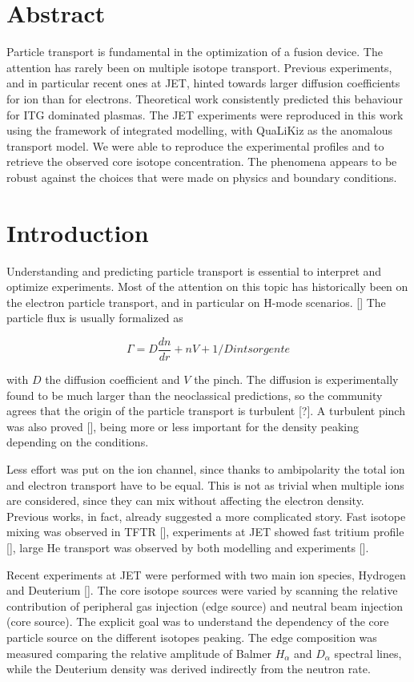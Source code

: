 \documentclass[a4paper,10pt]{iopart}
\begin{document}
\section{Abstract}
Particle transport is fundamental in the optimization of a fusion device. The attention has rarely been on multiple isotope transport. Previous experiments, and in particular recent ones at JET, hinted towards larger diffusion coefficients for ion than for electrons. Theoretical work consistently predicted this behaviour for ITG dominated plasmas. The JET experiments were reproduced in this work using the framework of integrated modelling, with QuaLiKiz as the anomalous transport model. We were able to reproduce the experimental profiles and to retrieve the observed core isotope concentration. The phenomena appears to be robust against the choices that were made on physics and boundary conditions.


\section{Introduction}

Understanding and predicting particle transport is essential to interpret and optimize experiments. Most of the attention on this topic has historically been on the electron particle transport, and in particular on H-mode scenarios. [] The particle flux is usually formalized as 

$$ \Gamma = D \frac{dn}{dr} + nV + 1/D int sorgente $$

with $ D $ the diffusion coefficient and $ V $ the pinch. The diffusion is experimentally found to be much larger than the neoclassical predictions, so the community agrees that the origin of the particle transport is turbulent [?]. A turbulent pinch was also proved [], being more or less important for the density peaking depending on the conditions.

Less effort was put on the ion channel, since thanks to ambipolarity the total ion and electron transport have to be equal. This is not as trivial when multiple ions are considered, since they can mix without affecting the electron density. Previous works, in fact, already suggested a more complicated story. Fast isotope mixing was observed in TFTR [], experiments at JET showed fast tritium profile [], large He transport was observed by both modelling and experiments [].

Recent experiments at JET were performed with two main ion species, Hydrogen and Deuterium []. The core isotope sources were varied by scanning the relative contribution of peripheral gas injection (edge source) and neutral beam injection (core source). The explicit goal was to understand the dependency of the core particle source on the different isotopes peaking. The edge composition was measured comparing the relative amplitude of Balmer $ H_{\alpha} $ and $D_{\alpha} $ spectral lines, while the Deuterium density was derived indirectly from the neutron rate.
\end{document}
